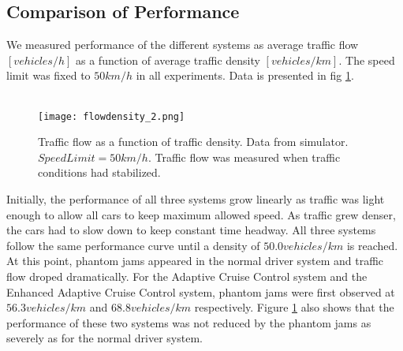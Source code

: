 \subsection{Comparison of Performance}
We measured performance of the different systems as average traffic flow
$ [\unit{vehicles/h}] $ as a function of average traffic density
$ [\unit{vehicles/km}] $. The speed limit was fixed to $ 50 \unit{km/h} $ in all
experiments. Data is presented in fig \ref{performance}.\\\\

\begin{figure}[h!]
    \begin{center}
    \texttt{[image: flowdensity\_2.png]}
    \caption{\label{performance}
Traffic flow as a function of traffic density. Data from simulator.
$SpeedLimit=50 \unit{km/h}$. Traffic flow was measured when traffic conditions had stabilized.}
    \end{center}
\end{figure}

Initially, the performance of all three systems grow linearly as traffic
was light enough to allow all cars to keep maximum allowed speed. As traffic
grew denser, the cars had to slow down to keep constant time headway. All
three systems follow the same performance curve until a density of $ 50.0
\unit{vehicles/km} $ is reached. At this point, phantom jams appeared in the
normal driver system and traffic flow droped dramatically. For the Adaptive
Cruise Control system and the Enhanced Adaptive Cruise Control system,
phantom jams were first observed at $ 56.3 \unit{vehicles/km} $ and $ 68.8
\unit{vehicles/km} $ respectively. Figure \ref{performance} also shows that
the performance of these two systems was not reduced by the phantom jams as
severely as for the normal driver system.



